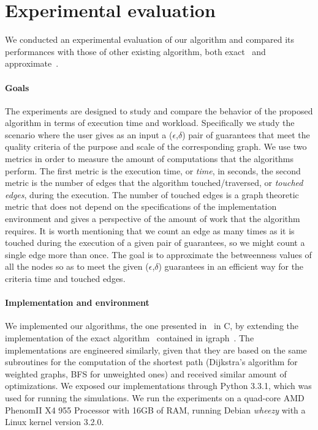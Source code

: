 


\section{Experimental evaluation}\label{sec:exper}
We conducted an experimental evaluation of our algorithm and
compared its performances with those of other existing algorithm, both
exact~\citep{Brandes01} and approximate~\citep{BrandesP07,JacobKLPT05}.

\paragraph{Goals} 

The experiments are designed to study and compare the behavior of the proposed algorithm in terms of execution time and workload.
Specifically we study the scenario where the user gives as an input a ($\epsilon$,$\delta$) pair of guarantees that meet the quality criteria of the purpose and scale of the corresponding  graph.
We use two metrics in order to measure the amount of computations that the algorithms perform.
The first metric is the execution time, or \textit{time}, in seconds, the second metric is the number of edges that the algorithm touched/traversed, or \textit{touched edges}, during the execution.
The number of touched edges is a graph theoretic metric that does not depend on the specifications of the implementation environment and gives a perspective of the amount of work that the algorithm requires.
It is worth mentioning that we count an edge as many times as it is touched  during the execution of a given pair of guarantees, so we might count a single edge more than once.
The goal is to approximate the betweenness values of all the nodes so as to meet the given ($\epsilon$,$\delta$) guarantees in an efficient way for the  criteria time and touched edges.


\paragraph{Implementation and environment}
We implemented our algorithms, the one presented in~\citep{BrandesP07,JacobKLPT05}
 in C, by extending the implementation of the exact algorithm~\citep{Brandes01} contained in igraph~\citep{igraph}. 
 The implementations are engineered similarly, given that they are based on the
same subroutines for the computation of the shortest path (Dijkstra's algorithm
for weighted graphs, BFS for unweighted ones) and received similar amount of
optimizations. We exposed our implementations through Python 3.3.1, which was
used for running the simulations. We run the experiments on a quad-core AMD
Phenom\texttrademark II X4 955 Processor with 16GB of RAM, running Debian
\emph{wheezy} with a Linux kernel version 3.2.0.

